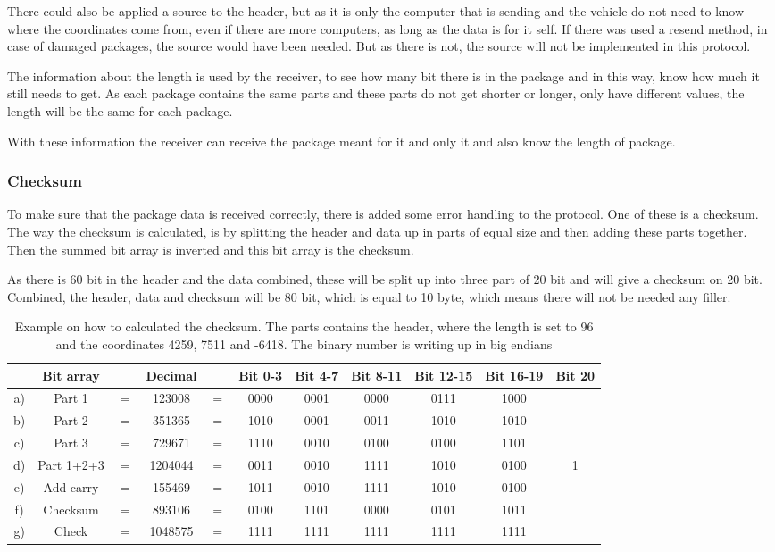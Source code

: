 There could also be applied a source to the header, but as it is only the computer that is sending and the vehicle do not need to know where the coordinates come from, even if there are more computers, as long as the data is for it self. If there was used a resend method, in case of damaged packages, the source would have been needed. But as there is not, the source will not be implemented in this protocol.

The information about the length is used by the receiver, to see how many bit there is in the package and in this way, know how much it still needs to get. As each package contains the same parts and these parts do not get shorter or longer, only have different values, the length will be the same for each package.

With these information the receiver can receive the package meant for it and only it and also know the length of package. 

\subsubsection{Checksum}
To make sure that the package data is received correctly, there is added some error handling to the protocol. One of these is a checksum. The way the checksum is calculated, is by splitting the header and data up in parts of equal size and then adding these parts together. Then the summed bit array is inverted and this bit array is the checksum. 

As there is 60 bit in the header and the data combined, these will be split up into three part of 20 bit and will give a checksum on 20 bit. Combined, the header, data and checksum will be 80 bit, which is equal to 10 byte, which means there will not be needed any filler.

\begin{table}[H]
\centering
\begin{tabular}{c c c c c c c c c c c}
   & Bit array  &     & Decimal &     & Bit 0-3 & Bit 4-7 & Bit 8-11 & Bit 12-15 & Bit 16-19 & Bit 20 \\
\hline
a) & Part 1     & $=$ & 123008  & $=$ & 0000 & 0001 & 0000 & 0111 & 1000 & \\
b) & Part 2     & $=$ & 351365  & $=$ & 1010 & 0001 & 0011 & 1010 & 1010 & \\
c) & Part 3     & $=$ & 729671  & $=$ & 1110 & 0010 & 0100 & 0100 & 1101 & \\
d) & Part 1+2+3 & $=$ & 1204044 & $=$ & 0011 & 0010 & 1111 & 1010 & 0100 & 1 \\
e) & Add carry  & $=$ & 155469  & $=$ & 1011 & 0010 & 1111 & 1010 & 0100 & \\
f) & Checksum   & $=$ & 893106  & $=$ & 0100 & 1101 & 0000 & 0101 & 1011 & \\
g) & Check      & $=$ & 1048575 & $=$ & 1111 & 1111 & 1111 & 1111 & 1111 & \\
\end{tabular}
\caption{Example on how to calculated the checksum. The parts contains the header, where the length is set to 96 and the coordinates 4259, 7511 and -6418. The binary number is writing up in big endians}
\label{ChecksumExp}
\end{table}

